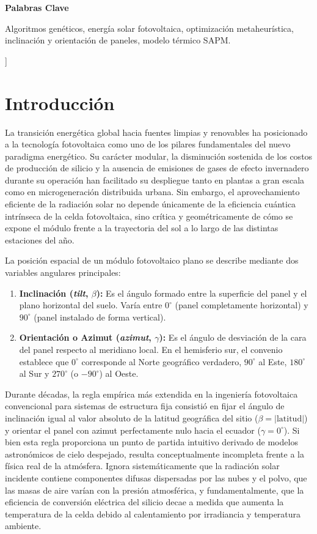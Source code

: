 \documentclass[12pt, a4paper, twocolumn]{article}
\begin{document}
  \noindent\textbf{\fontsize{10}{12}\selectfont Palabras Clave} \\
  {\fontsize{10}{12}\selectfont Algoritmos genéticos, energía solar fotovoltaica, optimización metaheurística, inclinación y orientación de paneles, modelo térmico SAPM.\par}
  \vspace{0.8cm}
]



\section{Introducción}
La transición energética global hacia fuentes limpias y renovables ha posicionado a la tecnología fotovoltaica como uno de los pilares fundamentales del nuevo paradigma energético. Su carácter modular, la disminución sostenida de los costos de producción de silicio y la ausencia de emisiones de gases de efecto invernadero durante su operación han facilitado su despliegue tanto en plantas a gran escala como en microgeneración distribuida urbana. Sin embargo, el aprovechamiento eficiente de la radiación solar no depende únicamente de la eficiencia cuántica intrínseca de la celda fotovoltaica, sino crítica y geométricamente de cómo se expone el módulo frente a la trayectoria del sol a lo largo de las distintas estaciones del año.

La posición espacial de un módulo fotovoltaico plano se describe mediante dos variables angulares principales:
\begin{enumerate}
    \item \textbf{Inclinación (\textit{tilt}, $\beta$):} Es el ángulo formado entre la superficie del panel y el plano horizontal del suelo. Varía entre $0^\circ$ (panel completamente horizontal) y $90^\circ$ (panel instalado de forma vertical).
    \item \textbf{Orientación o Azimut (\textit{azimut}, $\gamma$):} Es el ángulo de desviación de la cara del panel respecto al meridiano local. En el hemisferio sur, el convenio establece que $0^\circ$ corresponde al Norte geográfico verdadero, $90^\circ$ al Este, $180^\circ$ al Sur y $270^\circ$ (o $-90^\circ$) al Oeste.
\end{enumerate}

Durante décadas, la regla empírica más extendida en la ingeniería fotovoltaica convencional para sistemas de estructura fija consistió en fijar el ángulo de inclinación igual al valor absoluto de la latitud geográfica del sitio ($\beta = |\text{latitud}|$) y orientar el panel con azimut perfectamente nulo hacia el ecuador ($\gamma = 0^\circ$). Si bien esta regla proporciona un punto de partida intuitivo derivado de modelos astronómicos de cielo despejado, resulta conceptualmente incompleta frente a la física real de la atmósfera. Ignora sistemáticamente que la radiación solar incidente contiene componentes difusas dispersadas por las nubes y el polvo, que las masas de aire varían con la presión atmosférica, y fundamentalmente, que la eficiencia de conversión eléctrica del silicio decae a medida que aumenta la temperatura de la celda debido al calentamiento por irradiancia y temperatura ambiente.
\end{document}
